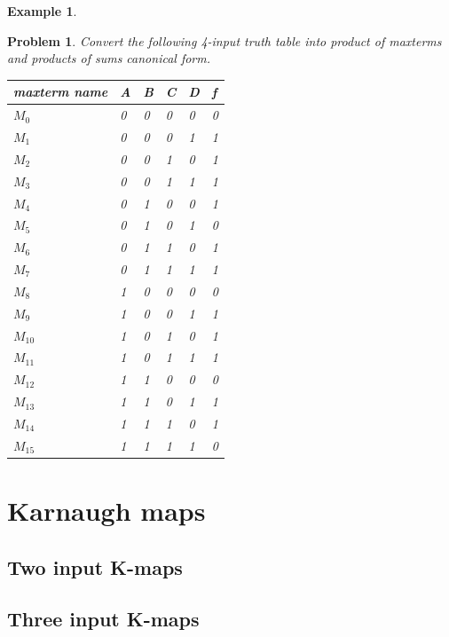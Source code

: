 \documentclass{article}
\newtheorem{example}{Example}
\newtheorem{prob}{Problem}
\begin{document}
\begin{example}
\end{example}

\begin{prob}
  Convert the following 4-input truth table into product of maxterms and products of sums canonical form.

  \noindent
  \begin{tabular}{p{20mm}llll|l}
    \toprule
    maxterm name & A & B & C & D & f \\
    \midrule
    $M_0$ & 0 & 0 & 0 & 0 & 0 \\ 
    $M_1$ & 0 & 0 & 0 & 1 & 1 \\ 
    $M_2$ & 0 & 0 & 1 & 0 & 1 \\ 
    $M_3$ & 0 & 0 & 1 & 1 & 1 \\ 
    $M_4$ & 0 & 1 & 0 & 0 & 1 \\ 
    $M_5$ & 0 & 1 & 0 & 1 & 0 \\ 
    $M_6$ & 0 & 1 & 1 & 0 & 1 \\ 
    $M_7$ & 0 & 1 & 1 & 1 & 1 \\ 
    $M_8$ & 1 & 0 & 0 & 0 & 0 \\ 
    $M_9$ & 1 & 0 & 0 & 1 & 1 \\ 
    $M_{10}$ & 1 & 0 & 1 & 0 & 1 \\
    $M_{11}$ & 1 & 0 & 1 & 1 & 1 \\
    $M_{12}$ & 1 & 1 & 0 & 0 & 0 \\
    $M_{13}$ & 1 & 1 & 0 & 1 & 1 \\
    $M_{14}$ & 1 & 1 & 1 & 0 & 1 \\
    $M_{15}$ & 1 & 1 & 1 & 1 & 0 \\
    \bottomrule
  \end{tabular}
\end{prob}

\section{Karnaugh maps}

\subsection{Two input K-maps}
\begin{Karnaughquatre}
\end{Karnaughquatre}
  
\subsection{Three input K-maps}
\begin{Karnaughvuit}
\end{Karnaughvuit}
\end{document}
